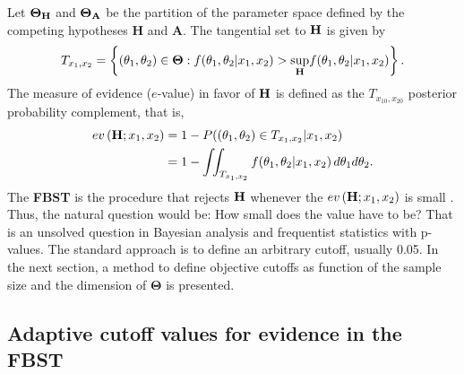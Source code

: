 \documentclass[AMA,Times1COL]{WileyNJDv5} %
\begin{document}
Let $\boldsymbol{\Theta}_\text{\textbf{H}}$ and $\boldsymbol{\Theta}_\text{\textbf{A}}$ be the partition of the parameter space defined by the competing hypotheses \textbf{H} and \textbf{A}. %
The tangential set to $\text{\textbf{H}}$ is given by
\begin{equation}
T_{x_{1},x_{2}}=\left\lbrace (\theta_1,\theta_2)\in \boldsymbol{\Theta}: f(\theta_1,\theta_2\vert x_{1},x_{2})>\underset{\text{\textbf{H}}}{\operatorname{sup}}f(\theta_1,\theta_2\vert x_{1},x_{2}) \right\rbrace.
\end{equation}
The measure of evidence ($e$-value) in favor of $\text{\textbf{H}}$ is defined as the $T_{x_{10},x_{20}}$ posterior probability complement, that is, 
\begin{align}\label{ev}
ev\left(\text{\textbf{H}};x_{1},x_{2}\right)&=1-P((\theta_1,\theta_2) \in T_{x_{1},x_{2}}\vert x_{1},x_{2})\nonumber\\
&=1- \int_{} \int_{T_{x_{1},x_{2}}}f(\theta_1,\theta_2\vert x_{1},x_{2})\, d\theta_1 d\theta_2.  
\end{align}
The \textbf{FBST} is the procedure that rejects $\text{\textbf{H}}$ whenever the $ev\left(\text{\textbf{H}};x_{1},x_{2}\right)$ is small \cite{PerSteWech-08}. Thus, the natural question would be: How
small does the value have to be? That is an unsolved question in Bayesian analysis and frequentist statistics with p-values.
The standard approach is to define an arbitrary cutoff, usually 0.05. In the next section, a method to define objective cutoffs as function of the sample size and the dimension of $\boldsymbol{\Theta}$ is presented.

\subsection{Adaptive cutoff values for evidence in the FBST}
\end{document}
